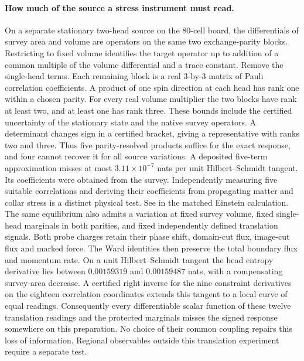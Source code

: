 \documentclass[11pt]{article}
\begin{document}
\paragraph{How much of the source a stress instrument must read.}
On a separate stationary two-head source on the 80-cell board, the
differentials of survey area and volume are operators on the same two
exchange-parity blocks. Restricting to fixed volume identifies the
target operator up to addition of a common multiple of the volume
differential and a trace constant. Remove the single-head terms. Each
remaining block is a real $3$-by-$3$ matrix of Pauli correlation
coefficients. A product of one spin direction at each head has rank
one within a chosen parity. For every real volume multiplier the
two blocks have rank at least two, and at least one has rank three.
These bounds include the certified uncertainty of the stationary state
and the native survey operators. A determinant changes sign in a
certified bracket, giving a representative with ranks two and three.
Thus five parity-resolved products suffice for the exact response,
and four cannot recover it for all source variations. A deposited
five-term approximation misses at most $3.11\times10^{-7}$ nats
per unit Hilbert--Schmidt tangent. Its coefficients were obtained
from the survey. Independently measuring five suitable correlations
and deriving their coefficients from propagating matter and collar
stress is a distinct physical test. See
in the matched Einstein calculation.
The same equilibrium also admits a variation at fixed survey volume,
fixed single-head marginals in both parities, and fixed independently
defined translation signals. Both probe charges retain their phase
shift, domain-cut flux, image-cut flux and marked force. The Ward
identities then preserve the total boundary flux and momentum rate.
On a unit Hilbert--Schmidt tangent the head entropy derivative lies
between $0.00159319$ and $0.00159487$ nats, with a compensating
survey-area decrease. A certified right inverse for the nine constraint
derivatives on the eighteen correlation coordinates extends this
tangent to a local curve of equal readings. Consequently every
differentiable scalar function of these twelve translation readings
and the protected marginals misses the signed response somewhere on
this preparation. No choice of their common coupling repairs this
loss of information. Regional observables outside this translation
experiment require a separate test.
\end{document}
